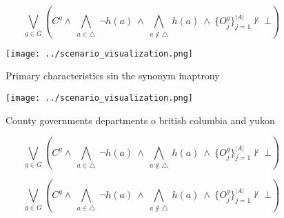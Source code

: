\documentclass[a4paper]{article}
\begin{document}
\[\bigvee_{g\in G} (C^g \wedge\ \bigwedge_{a\in \triangle}\ \neg h(a)\ \wedge\ \bigwedge_{a\notin \triangle}\ h(a)\ \wedge\ \{O_j^g\}_{j=1}^{|A|} \nvdash\ \bot )\]

\begin{figure}
\centering
\texttt{[image: ../scenario\_visualization.png]}
\caption{Primary characteristics sin the synonym inaptrony
}
\end{figure}
 
\begin{figure}
\centering
\texttt{[image: ../scenario\_visualization.png]}
\caption{County governments departments o british columbia and yukon
}
\end{figure}
 
\[\bigvee_{g\in G} (C^g \wedge\ \bigwedge_{a\in \triangle}\ \neg h(a)\ \wedge\ \bigwedge_{a\notin \triangle}\ h(a)\ \wedge\ \{O_j^g\}_{j=1}^{|A|} \nvdash\ \bot )\]

\[\bigvee_{g\in G} (C^g \wedge\ \bigwedge_{a\in \triangle}\ \neg h(a)\ \wedge\ \bigwedge_{a\notin \triangle}\ h(a)\ \wedge\ \{O_j^g\}_{j=1}^{|A|} \nvdash\ \bot )\]
\end{document}
